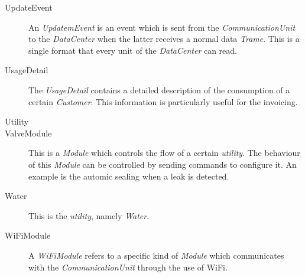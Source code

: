 \begin{description}
\item[UpdateEvent] An \emph{UpdatemEvent} is an event which is sent from the
\emph{CommunicationUnit} to the \emph{DataCenter} when the latter receives a
normal data \emph{Trame}. This is a single format that every unit of the
\emph{DataCenter} can read.

\item[UsageDetail] The \emph{UsageDetail} contains a detailed description of the
consumption of a certain \emph{Customer}. This information is particularly
useful for the invoicing.

\item[Utility] %

\item[ValveModule] This is a \emph{Module} which controls the flow of a certain
\emph{utility}. The behaviour of this \emph{Module} can be controlled by sending
commands to configure it. An example is the automic sealing when a leak is
detected.

\item[Water] This is the \emph{utility}, namely \emph{Water}.

\item[WiFiModule] A \emph{WiFiModule} refers to a specific kind of \emph{Module}
which communicates with the \emph{CommunicationUnit} through the use of WiFi.

\end{description}
